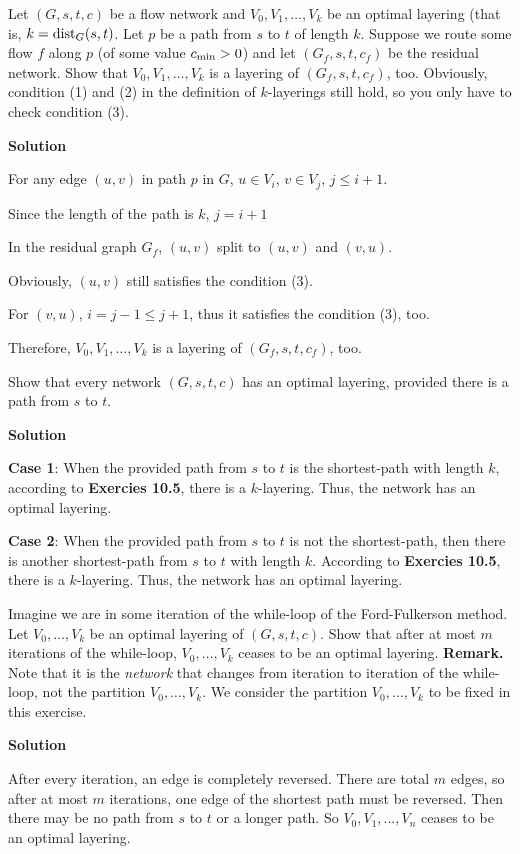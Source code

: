 
\begin{exercise}
   Let $(G,s,t,c)$ be a flow network and $V_0, V_1, \dots, V_k$ be an optimal layering
   (that is, $k = {\rm dist}_G(s,t)$.
   Let $p$ be a path from $s$ to $t$ of length $k$. 
   Suppose we route some flow $f$ along $p$ (of some
   value $c_{\rm min} > 0$) and let $(G_f,s,t,c_f)$ be the residual network. Show that
   $V_0, V_1,\dots, V_k$ is a layering of $(G_f,s,t,c_f)$, too. Obviously, condition (1) and (2) in
   the definition of $k$-layerings still hold, so you only have to check  condition (3).
\end{exercise}

\textbf{Solution}

For any edge $(u,v)$ in path $p$ in $G$, $u \in V_i$, $v \in V_j$, $j \leq i + 1$.

Since the length of the path is $k$, $j = i + 1$

In the residual graph $G_f$, $(u,v)$ split to $(u,v)$ and $(v,u)$.

Obviously, $(u,v)$ still satisfies the condition (3).

For $(v,u)$, $i = j-1 \leq j+1$, thus it satisfies the condition (3), too.

Therefore, $V_0, V_1, \dots, V_k$ is a layering of $(G_f, s, t, c_f)$, too.


\begin{exercise}
   Show that every network $(G,s,t,c)$ has an optimal layering, provided there is a path
   from $s$ to $t$.
\end{exercise}

\textbf{Solution}

\textbf{Case 1}: When the provided path from $s$ to $t$ is the shortest-path with length $k$, according to \textbf{Exercies 10.5}, there is a $k$-layering. Thus, the network has an optimal layering.

\textbf{Case 2}: When the provided path from $s$ to $t$ is not the shortest-path, then there is another shortest-path from $s$ to $t$ with length $k$. According to \textbf{Exercies 10.5}, there is a $k$-layering. Thus, the network has an optimal layering.


\begin{exercise}
   Imagine we are in some iteration of the while-loop of the Ford-Fulkerson method.
   Let $V_0, \dots, V_k$ be an optimal layering of $(G,s,t,c)$. Show that after at most $m$
   iterations of the while-loop, $V_0,\dots,V_k$ ceases
   to be an optimal layering. \textbf{Remark.} Note that it is the {\em network} that changes from
   iteration to iteration of the while-loop, not the partition $V_0,\dots,V_k$. We consider
   the partition $V_0,\dots,V_k$ to be fixed in this exercise.
\end{exercise}

\textbf{Solution}

After every iteration, an edge is completely reversed. There are total $m$ edges, so after at most $m$ iterations, one edge of the shortest path must be reversed. Then there may be no path from $s$ to $t$ or a longer path. So $V_0, V_1, \dots, V_n$ ceases to be an optimal layering.
